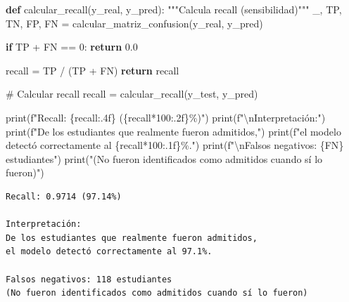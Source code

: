 \documentclass[
  doc,
  floatsintext,
  longtable,
  a4paper,
  nolmodern,
  notxfonts,
  notimes,
  12pt,
  colorlinks=true,linkcolor=blue,citecolor=blue,urlcolor=blue]{apa7}
\newenvironment{Shaded}{\begin{snugshade}}{\end{snugshade}}
\newcommand{\BuiltInTok}[1]{\textcolor[rgb]{0.00,0.23,0.31}{#1}}
\newcommand{\CharTok}[1]{\textcolor[rgb]{0.13,0.47,0.30}{#1}}
\newcommand{\CommentTok}[1]{\textcolor[rgb]{0.37,0.37,0.37}{#1}}
\newcommand{\ControlFlowTok}[1]{\textcolor[rgb]{0.00,0.23,0.31}{\textbf{#1}}}
\newcommand{\DecValTok}[1]{\textcolor[rgb]{0.68,0.00,0.00}{#1}}
\newcommand{\FloatTok}[1]{\textcolor[rgb]{0.68,0.00,0.00}{#1}}
\newcommand{\KeywordTok}[1]{\textcolor[rgb]{0.00,0.23,0.31}{\textbf{#1}}}
\newcommand{\NormalTok}[1]{\textcolor[rgb]{0.00,0.23,0.31}{#1}}
\newcommand{\OperatorTok}[1]{\textcolor[rgb]{0.37,0.37,0.37}{#1}}
\newcommand{\SpecialCharTok}[1]{\textcolor[rgb]{0.37,0.37,0.37}{#1}}
\newcommand{\SpecialStringTok}[1]{\textcolor[rgb]{0.13,0.47,0.30}{#1}}
\newcommand{\StringTok}[1]{\textcolor[rgb]{0.13,0.47,0.30}{#1}}
\begin{document}
\begin{Shaded}
\begin{Highlighting}[]
\KeywordTok{def}\NormalTok{ calcular\_recall(y\_real, y\_pred):}
    \CommentTok{"""Calcula recall (sensibilidad)"""}
\NormalTok{    \_, TP, TN, FP, FN }\OperatorTok{=}\NormalTok{ calcular\_matriz\_confusion(y\_real, y\_pred)}
    
    \ControlFlowTok{if}\NormalTok{ TP }\OperatorTok{+}\NormalTok{ FN }\OperatorTok{==} \DecValTok{0}\NormalTok{:}
        \ControlFlowTok{return} \FloatTok{0.0}
    
\NormalTok{    recall }\OperatorTok{=}\NormalTok{ TP }\OperatorTok{/}\NormalTok{ (TP }\OperatorTok{+}\NormalTok{ FN)}
    \ControlFlowTok{return}\NormalTok{ recall}

\CommentTok{\# Calcular recall}
\NormalTok{recall }\OperatorTok{=}\NormalTok{ calcular\_recall(y\_test, y\_pred)}

\BuiltInTok{print}\NormalTok{(}\SpecialStringTok{f"Recall: }\SpecialCharTok{\{}\NormalTok{recall}\SpecialCharTok{:.4f\}}\SpecialStringTok{ (}\SpecialCharTok{\{}\NormalTok{recall}\OperatorTok{*}\DecValTok{100}\SpecialCharTok{:.2f\}}\SpecialStringTok{\%)"}\NormalTok{)}
\BuiltInTok{print}\NormalTok{(}\SpecialStringTok{f"}\CharTok{\textbackslash{}n}\SpecialStringTok{Interpretación:"}\NormalTok{)}
\BuiltInTok{print}\NormalTok{(}\SpecialStringTok{f"De los estudiantes que realmente fueron admitidos,"}\NormalTok{)}
\BuiltInTok{print}\NormalTok{(}\SpecialStringTok{f"el modelo detectó correctamente al }\SpecialCharTok{\{}\NormalTok{recall}\OperatorTok{*}\DecValTok{100}\SpecialCharTok{:.1f\}}\SpecialStringTok{\%."}\NormalTok{)}
\BuiltInTok{print}\NormalTok{(}\SpecialStringTok{f"}\CharTok{\textbackslash{}n}\SpecialStringTok{Falsos negativos: }\SpecialCharTok{\{}\NormalTok{FN}\SpecialCharTok{\}}\SpecialStringTok{ estudiantes"}\NormalTok{)}
\BuiltInTok{print}\NormalTok{(}\StringTok{"(No fueron identificados como admitidos cuando sí lo fueron)"}\NormalTok{)}
\end{Highlighting}
\end{Shaded}

\begin{verbatim}
Recall: 0.9714 (97.14%)

Interpretación:
De los estudiantes que realmente fueron admitidos,
el modelo detectó correctamente al 97.1%.

Falsos negativos: 118 estudiantes
(No fueron identificados como admitidos cuando sí lo fueron)
\end{verbatim}
\end{document}
